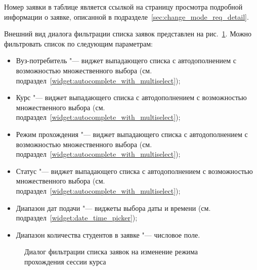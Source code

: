 Номер заявки в таблице является ссылкой на страницу просмотра подробной информации о заявке, 
описанной в подразделе~\ref{sec:change_mode_req_detail}.

Внешний вид диалога фильтрации списка заявок представлен на рис.~\ref{img:agreement:change_mode_req_list_filter}.
Можно фильтровать список по следующим параметрам:
\begin{itemize}
	\item Вуз-потребитель "--- виджет выпадающего списка с автодополнением с возможностью множественного выбора 
	(см. подраздел~\ref{widget:autocomplete_with_multiselect});
	\item Курс "--- виджет выпадающего списка с автодополнением с возможностью множественного выбора 
	(см. подраздел~\ref{widget:autocomplete_with_multiselect});
	\item Режим прохождения "--- виджет выпадающего списка с автодополнением с возможностью множественного выбора 
	(см. подраздел~\ref{widget:autocomplete_with_multiselect});
	\item Статус "--- виджет выпадающего списка с автодополнением с возможностью множественного выбора 
	(см. подраздел~\ref{widget:autocomplete_with_multiselect});
	\item Диапазон дат подачи "--- виджеты выбора даты и времени 
	(см. подраздел~\ref{widget:date_time_picker});
	\item Диапазон количества студентов в заявке "--- числовое поле.
\end{itemize}

\begin{figure}[H]
	\caption{Диалог фильтрации списка заявок на изменение режима прохождения сессии курса}
	\label{img:agreement:change_mode_req_list_filter}
\end{figure}

